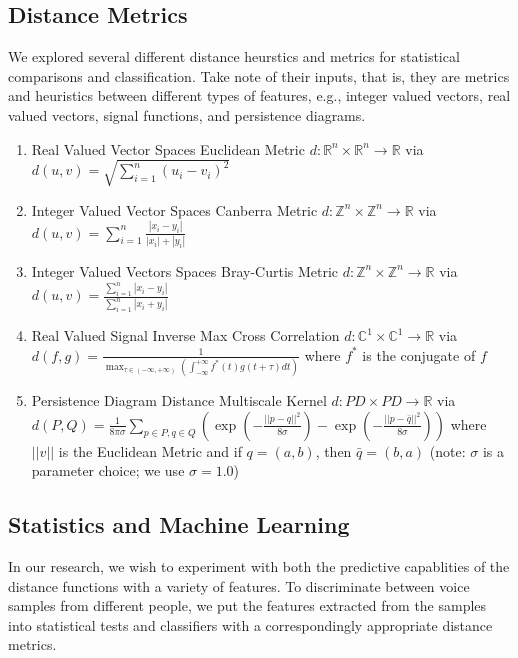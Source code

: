 \documentclass[12pt]{article}
\begin{document}
\subsection{Distance Metrics}
\-\hspace{1cm} We explored several different distance heurstics and metrics for
statistical comparisons and classification. Take note of their inputs, that is,
they are metrics and heuristics between different types of features, e.g.,
integer valued vectors, real valued vectors, signal functions, and persistence
diagrams.
\begin{enumerate}
  \item Real Valued Vector Spaces Euclidean Metric \newline $d : \mathbb{R}^n
  \times \mathbb{R}^n \rightarrow \mathbb{R}$ via $d(u,v) = \sqrt{\sum_{i=1}^{n}(u_i - v_i)^2}$
  \item Integer Valued Vector Spaces Canberra Metric \newline $d : \mathbb{Z}^n
  \times \mathbb{Z}^n \rightarrow \mathbb{R}$ via $d(u,v) = \sum_{i = 1}^{n} \frac{|x_i -
  y_i|}{|x_i| + |y_i|}$ \cite{Distance Metric}
  \item Integer Valued Vectors Spaces Bray-Curtis Metric \newline $d :
  \mathbb{Z}^n \times \mathbb{Z}^n \rightarrow \mathbb{R}$ via $d(u,v) = \frac{\sum_{i = 1}^{n}|x_i
  - y_i|}{\sum_{i = 1}^{n}|x_i + y_i|}$ \cite{Distance Metric} \cite{braycurtis}
  \item Real Valued Signal Inverse Max Cross Correlation \newline $d :
  \mathbb{C}^1 \times \mathbb{C}^1 \rightarrow \mathbb{R}$ via $d(f,g) =
  \frac{1}{\max _{\tau \in (-\infty,+\infty)} (\int _{-\infty}^{+\infty}
  f^{*}(t)g(t+\tau)dt)}$ where $f^{*}$ is the conjugate of $f$ \cite{cross
  correlation}
  \item Persistence Diagram Distance Multiscale Kernel \newline $d : PD \times
  PD \rightarrow \mathbb{R}$ via $d(P,Q) = \frac{1}{8 \pi \sigma} \sum_{p \in
  P, q \in Q}(\exp(-\frac{||p-q||^2}{8 \sigma}) -
  \exp(-\frac{||p-\bar{q}||^2}{8 \sigma}))$ where $||v||$ is the Euclidean
  Metric and if $q = (a,b)$, then $\bar{q} = (b,a)$ (note: $\sigma$ is a
  parameter choice; we use $\sigma = 1.0$) \cite{multiscale kernel}
\end{enumerate}

\subsection{Statistics and Machine Learning}
\-\hspace{1cm} In our research, we wish to experiment with both the predictive
capablities of the distance functions with a variety of features. To
discriminate between voice samples from different people, we put the features
extracted from the samples into statistical tests and  classifiers with a
correspondingly appropriate distance metrics.
\end{document}
